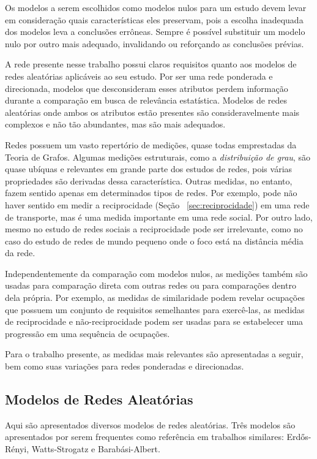 \documentclass[12pt,a4paper,final]{article}
\begin{document}
Os modelos a serem escolhidos como modelos nulos para um estudo devem levar em consideração quais características eles preservam, pois a escolha inadequada dos modelos leva a conclusões errôneas. Sempre é possível substituir um modelo nulo por outro mais adequado, invalidando ou reforçando as conclusões prévias.

A rede presente nesse trabalho possui claros requisitos quanto aos modelos de redes aleatórias aplicáveis ao seu estudo. Por ser uma rede ponderada e direcionada, modelos que desconsideram esses atributos perdem informação durante a comparação em busca de relevância estatística. Modelos de redes aleatórias onde ambos os atributos estão presentes são consideravelmente mais complexos e não tão abundantes, mas são mais adequados.

Redes possuem um vasto repertório de medições, quase todas emprestadas da Teoria de Grafos. Algumas medições estruturais, como a \textit{distribuição de grau}, são quase ubíquas e relevantes em grande parte dos estudos de redes, pois várias propriedades são derivadas dessa característica. Outras medidas, no entanto, fazem sentido apenas em determinados tipos de redes. Por exemplo, pode não haver sentido em medir a reciprocidade (Seção ~\ref{sec:reciprocidade}) em uma rede de transporte, mas é uma medida importante em uma rede social. Por outro lado, mesmo no estudo de redes sociais a reciprocidade pode ser irrelevante, como no caso do estudo de redes de mundo pequeno onde o foco está na distância média da rede.

Independentemente da comparação com modelos nulos, as medições também são usadas para comparação direta com outras redes ou para comparações dentro dela própria. Por exemplo, as medidas de similaridade podem revelar ocupações que possuem um conjunto de requisitos semelhantes para exercê-las, as medidas de reciprocidade e não-reciprocidade podem ser usadas para se estabelecer uma progressão em uma sequência de ocupações.

Para o trabalho presente, as medidas mais relevantes são apresentadas a seguir, bem como suas variações para redes ponderadas e direcionadas.

\subsection{Modelos de Redes Aleatórias}

Aqui são apresentados diversos modelos de redes aleatórias. Três modelos são apresentados por serem frequentes como referência em trabalhos similares: Erdős-Rényi, Watts-Strogatz e Barabási-Albert.
\end{document}
